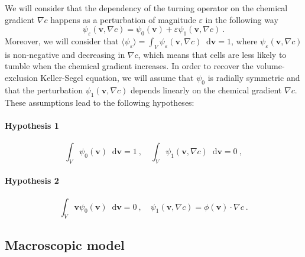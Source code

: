 \documentclass[review,onefignum,onetabnum]{siamart220329}
\newcommand*\diff{\mathop{}\!\mathrm{d}}
\begin{document}
{We will consider that the dependency of the turning operator on the chemical gradient $\nabla c$ happens as a perturbation of magnitude $\varepsilon$ in the following way
\begin{equation}\label{expansion_psi}
    \psi_\varepsilon(\mathbf{v},\nabla c)=\psi_0(\mathbf{v})+\varepsilon\psi_1(\mathbf{v},\nabla c)\ .
\end{equation}
Moreover, we will consider that $\langle\psi_\varepsilon \rangle = \int_V \psi_\varepsilon (\mathbf{v},\nabla c) \diff \mathbf{v} = 1$, {where $\psi_\varepsilon(\mathbf{v},\nabla c)$ is non-negative and decreasing in $\nabla c$, which means that cells are less likely to tumble when the chemical gradient increases.} In order to recover the volume-exclusion Keller-Segel equation, we will assume that $\psi_0$ is radially symmetric and that the perturbation $\psi_1(\mathbf{v},\nabla c)$ depends linearly on the chemical gradient $\nabla c$. These assumptions lead to the following hypotheses: 
\paragraph{Hypothesis 1}
\begin{equation}\tag{H1}
    \int_V\psi_0(\mathbf{v})\diff \mathbf{v}=1\ , \quad \int_V\psi_1(\mathbf{v},\nabla c)\diff \mathbf{v}=0\ ,\label{hypo1}
\end{equation}
\paragraph{Hypothesis 2}
\begin{equation}\tag{H2}
\int_V \mathbf{v}\psi_0(\mathbf{v})\diff \mathbf{v}=0\ , \quad \psi_1(\mathbf{v},\nabla c) = \phi(\mathbf{v}) \cdot \nabla c\ . \label{hypo2}
\end{equation}
}

\subsection{Macroscopic model}\label{sec:macroscopic derivation} 
\end{document}
